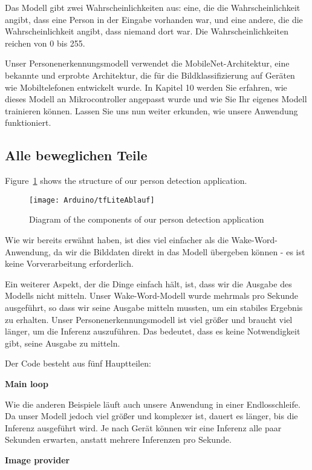 Das Modell gibt zwei Wahrscheinlichkeiten aus: eine, die die Wahrscheinlichkeit angibt, dass eine Person in der Eingabe vorhanden war, und eine andere, die die Wahrscheinlichkeit angibt, dass niemand dort war. Die Wahrscheinlichkeiten reichen von 0 bis 255.

Unser Personenerkennungsmodell verwendet die MobileNet-Architektur, eine bekannte und erprobte Architektur, die für die Bildklassifizierung auf Geräten wie Mobiltelefonen entwickelt wurde. In Kapitel 10 werden Sie erfahren, wie dieses Modell an Mikrocontroller angepasst wurde und wie Sie Ihr eigenes Modell trainieren können. Lassen Sie uns nun weiter erkunden, wie unsere Anwendung funktioniert.


\subsection{Alle beweglichen Teile}


Figure~\ref{tflite:Ablauf} shows the structure of our person detection application.

\begin{figure}
  \centering
  \texttt{[image: Arduino/tfLiteAblauf]}
  \caption{Diagram of the components of our person detection application}\label{tflite:Ablauf}
\end{figure}

Wie wir bereits erwähnt haben, ist dies viel einfacher als die Wake-Word-Anwendung, da wir die Bilddaten direkt in das Modell übergeben können - es ist keine Vorverarbeitung erforderlich.

Ein weiterer Aspekt, der die Dinge einfach hält, ist, dass wir die Ausgabe des Modells nicht mitteln. Unser Wake-Word-Modell wurde mehrmals pro Sekunde ausgeführt, so dass wir seine Ausgabe mitteln mussten, um ein stabiles Ergebnis zu erhalten. Unser Personenerkennungsmodell ist viel größer und braucht viel länger, um die Inferenz auszuführen. Das bedeutet, dass es keine Notwendigkeit gibt, seine Ausgabe zu mitteln.

Der Code besteht aus fünf Hauptteilen:

\textbf{Main loop}

Wie die anderen Beispiele läuft auch unsere Anwendung in einer Endlosschleife. Da unser Modell jedoch viel größer und komplexer ist, dauert es länger, bis die Inferenz ausgeführt wird. Je nach Gerät können wir eine Inferenz alle paar Sekunden erwarten, anstatt mehrere Inferenzen pro Sekunde.

\textbf{Image provider}

